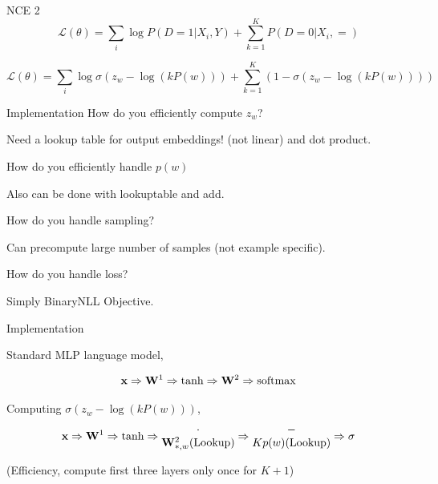 \documentclass{beamer}
\begin{document}
\begin{frame}{NCE 2}
  \[ \mathcal{L}(\theta) = \sum_{i} \log P(D=1| X_i, Y) + \sum_{k=1}^{K} P(D=0|X_i, = )  \] 
  
  \[ \mathcal{L}(\theta) = \sum_{i} \log \sigma(z_w - \log(k P(w)))  + \sum_{k=1}^{K} (1- \sigma(z_w - \log(k P(w))))  \] 
\end{frame}

\begin{frame}{Implementation}
  How do you efficiently compute $z_w$? 

  Need a lookup table for output embeddings! (not linear) and dot product.

  How do you efficiently handle $p(w)$ 
  
  Also can be done with lookuptable and add.

  How do you handle sampling? 

  Can precompute large number of samples (not example specific).

  How do you handle loss?

  Simply BinaryNLL Objective.
\end{frame}

\begin{frame}{Implementation}
  
  Standard MLP language model,

  \[\boldx \Rightarrow \boldW^1 \Rightarrow \tanh \Rightarrow  \boldW^2 \Rightarrow \softmax\]



  Computing $\sigma(z_w - \log(k P(w)))$,
 \[\mathbf{x} \Rightarrow \mathbf{W}^1 \Rightarrow \tanh \Rightarrow
 \begin{matrix}
   \cdot \\ 
   \mathbf{W}^2_{*, w} \mathrm{(Lookup)}
 \end{matrix}
 \Rightarrow  \begin{matrix}
   - \\ 
   K p(w) \mathrm{(Lookup)}
 \end{matrix}
\Rightarrow \sigma\]


 
                                                                                       

  (Efficiency, compute first three layers only once for $K+1$)

\end{frame}
\end{document}
